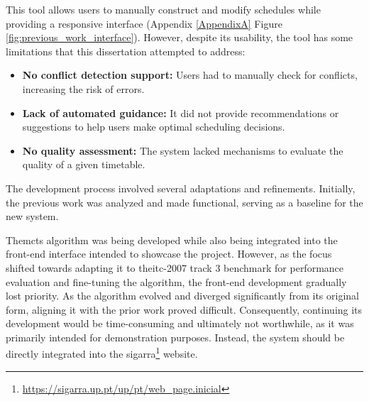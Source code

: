 This tool allows users to manually construct and modify schedules while providing a responsive interface (Appendix \ref{AppendixA} Figure \ref{fig:previous_work_interface}). However, despite its usability, the tool has some limitations that this dissertation attempted to address:

\begin{itemize}
\item \textbf{No conflict detection support:} Users had to manually check for conflicts, increasing the risk of errors.
\item \textbf{Lack of automated guidance:} It did not provide recommendations or suggestions to help users make optimal scheduling decisions.
\item \textbf{No quality assessment:} The system lacked mechanisms to evaluate the quality of a given timetable.
\end{itemize}

The development process involved several adaptations and refinements. Initially, the previous work was analyzed and made functional, serving as a baseline for the new system. 

The\ac{mcts} algorithm was being developed while also being integrated into the front-end interface intended to showcase the project. However, as the focus shifted towards adapting it to the\ac{itc-2007} track 3 benchmark for performance evaluation and fine-tuning the algorithm, the front-end development gradually lost priority. As the algorithm evolved and diverged significantly from its original form, aligning it with the prior work proved difficult. Consequently, continuing its development would be time-consuming and ultimately not worthwhile, as it was primarily intended for demonstration purposes. Instead, the system should be directly integrated into the sigarra\footnote{\url{https://sigarra.up.pt/up/pt/web\_page.inicial}} website.



